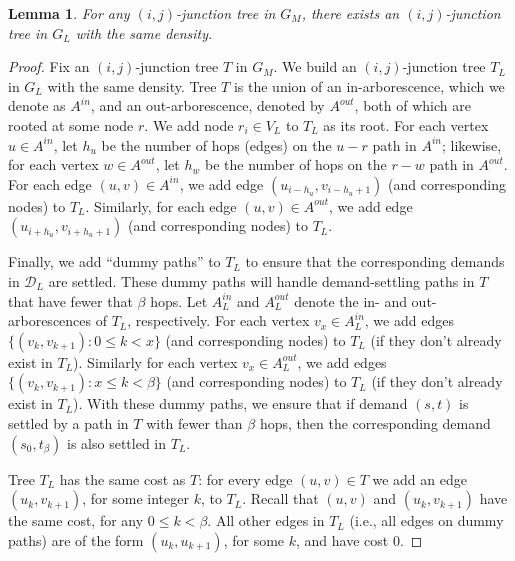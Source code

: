\documentclass{article}
\newtheorem{lemma}[theorem]{Lemma}
\theoremstyle{definition}
\theoremstyle{remark}
\begin{document}
\iflong
\begin{lemma}
\label{cl:input_to_layered}
    For any $(i,j)$-junction tree in $G_M$, there exists an $(i,j)$-junction tree in $G_L$ with the same density. 
\end{lemma}
\begin{proof}
    Fix an $(i,j)$-junction tree $T$ in $G_M$. We build an $(i,j)$-junction tree $T_L$ in $G_L$ with the same density. Tree $T$ is the union of an in-arborescence, which we denote as $A^{in}$, and an out-arborescence, denoted by $A^{out}$, both of which are rooted at some node $r$. We add node $r_i \in V_L$ to $T_L$ as its root. 
    For each vertex $u \in A^{in}$, let $h_u$ be the number of hops (edges) on the $u-r$ path in $A^{in}$; likewise, for each vertex $w \in A^{out}$, let $h_w$ be the number of hops on the $r-w$ path in $A^{out}$. For each edge $(u,v) \in A^{in}$, we add edge $(u_{i-h_u}, v_{i-h_u+1})$ (and corresponding nodes) to $T_L$. Similarly, for each edge $(u,v) \in A^{out}$, we add edge $(u_{i+h_u}, v_{i+h_u+1})$ (and corresponding nodes) to $T_L$.
   
    Finally, we add ``dummy paths'' to $T_L$ to ensure that the corresponding demands in $\mathcal{D}_L$ are settled. These dummy paths will handle demand-settling paths in $T$ that have fewer that $\beta$ hops. Let $A^{in}_L$ and $A^{out}_L$ denote the in- and out-arborescences of $T_L$, respectively. For each vertex $v_x \in A^{in}_L$, we add edges $\{ (v_k, v_{k+1}) :  0 \leq k < x  \}$ (and corresponding nodes) to $T_L$ (if they don't already exist in $T_L$). Similarly for each vertex $v_x \in A^{out}_L$, we add edges $\{ (v_k, v_{k+1}) :  x \leq k < \beta  \}$ (and corresponding nodes) to $T_L$ (if they don't already exist in $T_L$). With these dummy paths, we ensure that if demand $(s,t)$ is settled by a path in $T$ with fewer than $\beta$ hops, then the corresponding demand $(s_0, t_\beta)$ is also settled in $T_L$.  

    Tree $T_L$ has the same cost as $T$: for every edge $(u,v) \in T$ we add an edge $(u_k, v_{k+1})$, for some integer $k$, to $T_L$. Recall that $(u,v)$ and $(u_k, v_{k+1})$ have the same cost, for any $0 \leq k < \beta$. All other edges in $T_L$ (i.e., all edges on dummy paths) are of the form $(u_k, u_{k+1})$, for some $k$, and have cost $0$. 
    

\end{proof}
\end{document}
